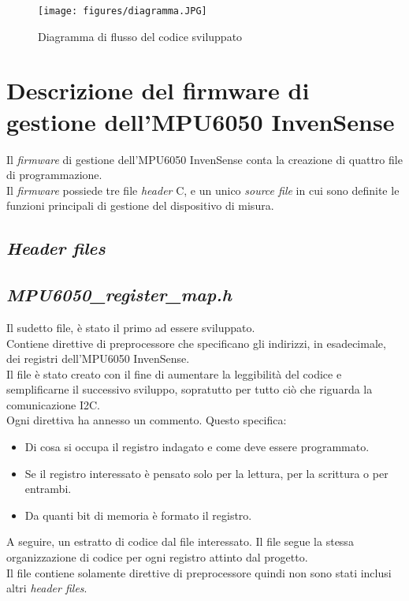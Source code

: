 \documentclass[11pt]{report}
\begin{document}
\begin{figure}[H]
\centering
\texttt{[image: figures/diagramma.JPG]}
\caption{Diagramma di flusso del codice sviluppato}
\label{fig:diagramma}
\end{figure}

\section{Descrizione del firmware di gestione dell'MPU6050 InvenSense}
Il \textit{firmware} di gestione dell'MPU6050 InvenSense conta la creazione di quattro file di programmazione.\\
Il \textit{firmware} possiede tre file \textit{header} C, e un unico \textit{source file} in cui sono definite le funzioni principali di gestione del dispositivo di misura.
\subsection{\textit{Header files}}
\subsection{\textit{MPU6050\_register\_map.h}}
Il sudetto file, è stato il primo ad essere sviluppato.\\
Contiene direttive di preprocessore che specificano gli indirizzi, in esadecimale, dei registri dell'MPU6050 InvenSense.\\
Il file è stato creato con il fine di aumentare la leggibilità del codice e semplificarne il successivo sviluppo, sopratutto per tutto ciò che riguarda la comunicazione I2C.\\
Ogni direttiva ha annesso un commento. Questo specifica:
\begin{itemize}
\item Di cosa si occupa il registro indagato e come deve essere programmato.
\item Se il registro interessato è pensato solo per la lettura, per la scrittura o per entrambi.
\item Da quanti bit di memoria è formato il registro.
\end{itemize}
A seguire, un estratto di codice dal file interessato. Il file segue la stessa organizzazione di codice per ogni registro attinto dal progetto.\\

Il file contiene solamente direttive di preprocessore quindi non sono stati inclusi altri \textit{header files}.
\end{document}
